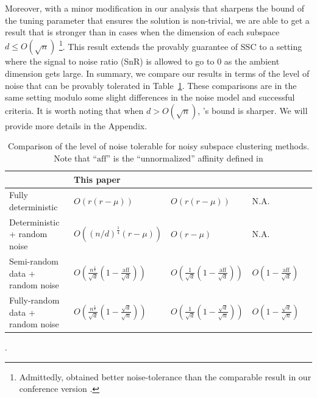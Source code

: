 \documentclass[twoside,11pt]{article}
\numberwithin{equation}{section}
\begin{document}
Moreover, with a minor modification in our analysis that sharpens the bound of the tuning parameter that ensures the solution is non-trivial, we are able to get a result that is stronger than \citet{soltanolkotabi2013robust} in cases when the dimension of each subspace $d\leq O(\sqrt{n})$ \footnote{Admittedly, \citep{soltanolkotabi2013robust} obtained better noise-tolerance than the comparable result in our conference version \citep{wang2013noisy}. }. This result extends the provably guarantee of SSC to a setting where the signal to noise ratio (SnR) is allowed to go to $0$ as the ambient dimension gets large. In summary, we compare our results in terms of the level of noise that can be provably tolerated in Table~\ref{tab:comparison}. These comparisons are in the same setting modulo some slight differences in the noise model and successful criteria. It is worth noting that when $d>O(\sqrt{n})$, \citet{soltanolkotabi2013robust}'s bound is sharper. We will provide more details in the Appendix.





\begin{table}
\centering
\small{
\begin{tabular}{|p{2.2in}|p{1.05in}|p{1in}|p{1in}|p{1.2in}|}
  \hline
   & This paper & \citep{wang2013noisy} & \citet{soltanolkotabi2013robust} \\\hline %
  Fully deterministic & $O(r(r-\mu))$ & $O(r(r-\mu))$ & N.A.  \\\hline
  Deterministic + random noise & $O((n/d)^{\frac{1}{4}}(r-\mu))$ & $O(r-\mu)$ & N.A.   \\\hline
  Semi-random data + random noise & $O\left(\frac{n^{\frac{1}{4}}}{\sqrt{d}}(1-\frac{\text{aff}}{\sqrt{d}})\right)$ & $O\left(\frac{1}{\sqrt{d}}(1-\frac{\text{aff}}{\sqrt{d}})\right)$ & $O\left(1-\frac{\text{aff}}{\sqrt{d}}\right)$  \\\hline
    Fully-random data + random noise & $O\left(\frac{n^{\frac{1}{4}}}{\sqrt{d}}(1-\frac{\sqrt{d}}{\sqrt{n}})\right)$ & $O\left(\frac{1}{\sqrt{d}}(1-\frac{\sqrt{d}}{\sqrt{n}})\right)$ & $O\left(1-\frac{\sqrt{d}}{\sqrt{n}}\right)$  \\
  \hline
\end{tabular}
}
\caption{Comparison of the level of noise tolerable for noisy subspace clustering methods. Note that ``$\mathrm{aff}$'' is the ``unnormalized'' affinity defined in \citep{soltanolkotabi2011geometric}}.\label{tab:comparison}
\end{table}
\end{document}

